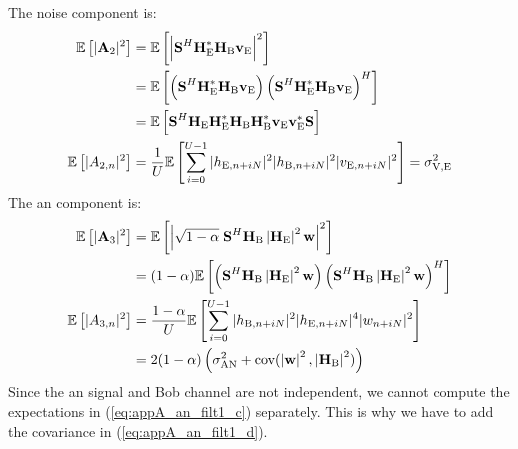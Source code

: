 The noise component is:
\begin{subequations}
    \begin{align}
        \mathbb{E} \left[|\textbf{A}_{2}|^2\right] &=  \mathbb{E} \left[\left|\textbf{S}^H \textbf{H}_{\text{E}}^* \textbf{H}_{\text{B}} \textbf{v}_{\text{E}}\right|^2\right] \\
        &= \mathbb{E} \left[\left(\textbf{S}^H \textbf{H}_{\text{E}}^* \textbf{H}_{\text{B}} \textbf{v}_{\text{E}} \right)\left(\textbf{S}^H \textbf{H}_{\text{E}}^* \textbf{H}_{\text{B}} \textbf{v}_{\text{E}} \right)^H\right] \\
        &=\mathbb{E} \left[\textbf{S}^H   \textbf{H}_{\text{E}} \textbf{H}_{\text{E}}^* \textbf{H}_{\text{B}}\textbf{H}_{\text{B}}^*  \textbf{v}_{\text{E}} \textbf{v}_{\text{E}}^* \textbf{S} \right] \\
       \mathbb{E} \left[|A_{2,n}|^2\right] &= \frac{1}{U} \mathbb{E} \left[\sum_{i=0}^{U-1} |h_{\text{E}, n + iN}|^2 |h_{\text{B}, n + iN}|^2 |v_{\text{E}, n + iN}|^2\right] = \sigma^2_{\text{V,E}}
    \end{align}
    \label{eq:appA:noise_eve_filt1}
\end{subequations}
The \gls{an} component is:
\begin{subequations}
    \begin{align}
        \mathbb{E} \left[|\textbf{A}_{3}|^2\right] &= \mathbb{E} \left[\left|\sqrt{1-\alpha} \; \textbf{S}^H \textbf{H}_{\text{B}}\left|\textbf{H}_{\text{E}}\right|^2 \textbf{w}\right|^2\right] \\
        &= (1-\alpha) \mathbb{E} \left[\left(\textbf{S}^H \textbf{H}_{\text{B}}\left|\textbf{H}_{\text{E}}\right|^2 \textbf{w} \right)\left(\textbf{S}^H \textbf{H}_{\text{B}}\left|\textbf{H}_{\text{E}}\right|^2 \textbf{w}\right)^H\right] \\
        \mathbb{E} \left[|A_{3,n}|^2\right] &= \frac{1-\alpha}{U} \mathbb{E} \left[\sum_{i=0}^{U-1}  |h_{\text{B}, n + iN}|^2 |h_{\text{E}, n + iN}|^4 |w_{n + iN}|^2\right] \label{eq:appA_an_filt1_c} \\ 
        &= 2(1-\alpha) \left( \sigma^2_{\text{AN}} + \text{cov}(\left|\textbf{w}\right|^2,\left|\textbf{H}_\text{B}\right|^2) \right) \label{eq:appA_an_filt1_d}
    \end{align}
\end{subequations}
Since the \gls{an} signal and Bob channel are not independent, we cannot compute the expectations in (\ref{eq:appA_an_filt1_c}) separately. This is why we have  to add the covariance in (\ref{eq:appA_an_filt1_d}).









